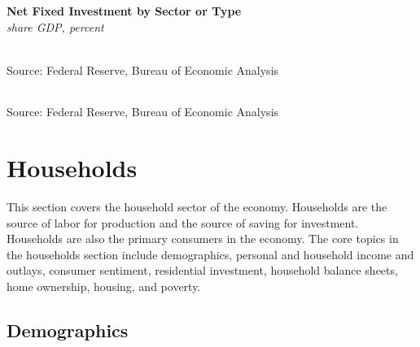 \documentclass{report}
\makeatletter
\newcommand{\tbllink}[1]{\href{https://raw.githubusercontent.com/bdecon/US-chartbook/master/chartbook/data/#1}{\faTable}}
\newcommand*\short[1]{\expandafter\@gobbletwo\number\numexpr#1\relax}
\newcommand{\sbar}[4]{
		\addplot[ybar stacked, bar width=2.4pt, draw opacity=0, fill=#1] 
			table [x=#2, y=#3, col sep=comma]{#4};}
\newcommand{\dateaxisticks}{
		date coordinates in=x, axis line style={draw=none},
		xmax={2023-02-15},
		max space between ticks=40,	    
		xtick={{1990-01-01}, {1992-01-01}, {1994-01-01}, 
			{1996-01-01}, {1998-01-01}, {2000-01-01}, 
			{2002-01-01}, {2004-01-01}, {2006-01-01},
			{2008-01-01}, {2010-01-01}, {2012-01-01}, {2014-01-01},
		    {2016-01-01}, {2018-01-01}, {2020-01-01}, {2022-01-01}, 
		    {2024-01-01}, {2026-01-01}},
		minor xtick={{1989-01-01}, {1991-01-01}, {1993-01-01},
			{1995-01-01}, {1997-01-01}, {1999-01-01}, 
			{2001-01-01}, {2003-01-01}, {2005-01-01}, {2007-01-01},
		    {2009-01-01}, {2011-01-01}, {2013-01-01}, {2015-01-01},
		    {2017-01-01}, {2019-01-01}, {2021-01-01}, {2023-01-01}, 
		    {2025-01-01}, {2027-01-01}},
		enlarge y limits={0.06}, enlarge x limits={0.01},
		}
\newcommand{\bbar}[2]{extra #1 ticks = {{#2}}, extra #1 tick labels = ,
		extra #1 tick style = {grid=major, grid style={thick, black!25}},}
\newcommand{\rbars}{
		\fill[color=black!10] (axis cs:{1990-07-01},\pgfkeysvalueof{/pgfplots/ymin}) rectangle 
			(axis cs:{1991-03-01}, \pgfkeysvalueof{/pgfplots/ymax});
		\fill[color=black!10] (axis cs:{2007-12-01},\pgfkeysvalueof{/pgfplots/ymin}) rectangle 
			(axis cs:{2009-07-01}, \pgfkeysvalueof{/pgfplots/ymax});
		\fill[color=black!10] (axis cs:{2001-03-01},\pgfkeysvalueof{/pgfplots/ymin}) rectangle 
			(axis cs:{2001-11-01}, \pgfkeysvalueof{/pgfplots/ymax});
		\fill[color=black!10] (axis cs:{2020-02-01},\pgfkeysvalueof{/pgfplots/ymin}) rectangle 
			(axis cs:{2020-05-01}, \pgfkeysvalueof{/pgfplots/ymax});}
\makeatother
\begin{document}
{\begin{minipage}{0.76\textwidth}
\normalsize \textbf{Net Fixed Investment by Sector or Type}\\
\footnotesize{\textit{share GDP, percent}}\\
\hspace*{-2mm} \\
\footnotesize{Source: Federal Reserve, Bureau of Economic Analysis} \hfill \tbllink{z1_nfi.csv}

 \setlength{\tabcolsep}{3.5pt} \color{black!90}
		{\renewcommand{\arraystretch}{1.5}
		 \begin{tabular}{p{42mm} R{7.8mm} R{7.8mm} R{7.8mm} R{7.8mm} 
		   R{8.2mm} R{8.2mm} R{8.2mm} }
			  \hline
		\end{tabular}}	\vspace{-2mm}
		
\footnotesize{Source: Federal Reserve, Bureau of Economic Analysis}
\end{minipage}
\newpage
\hypertarget{hh}{}
\section*{Households}
\begin{minipage}{0.76\textwidth}
\small This section covers the household sector of the economy. Households are the source of labor for production and the source of saving for investment. Households are also the primary consumers in the economy. The core topics in the households section include demographics, personal and household income and outlays, consumer sentiment, residential investment, household balance sheets, home ownership, housing, and poverty.

\hypertarget{hhdem}{}
\subsection*{Demographics}
\vspace{-1.0mm}


\end{minipage}}
\end{document}
